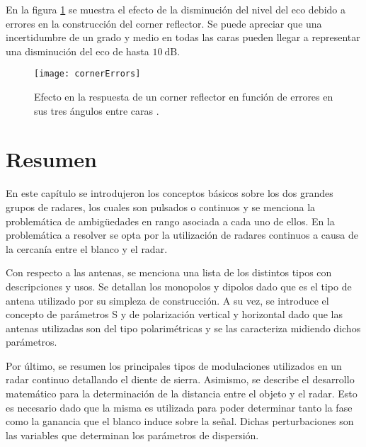 En la figura \ref{fig:cornerErrors} se muestra el efecto de la disminución del nivel del eco debido a errores en la construcción del corner reflector. Se puede apreciar que una incertidumbre de un grado y medio en todas las caras pueden llegar a representar una disminución del eco de hasta $\SI{10}{\dB}$.

\begin{figure}[H]
 \centering
 \texttt{[image: cornerErrors]}
 \caption{Efecto en la respuesta de un corner reflector en función de errores en sus tres ángulos entre caras \cite{Michelson1993}.}
 \label{fig:cornerErrors}
\end{figure}


\section{Resumen}

En este capítulo se introdujeron los conceptos básicos sobre los dos grandes grupos de radares, los cuales son pulsados o continuos y se menciona la problemática de ambigüedades en rango asociada a cada uno de ellos. En la problemática a resolver se opta por la utilización de radares continuos a causa de la cercanía entre el blanco y el radar.

Con respecto a las antenas, se menciona una lista de los distintos tipos con descripciones y usos. Se detallan los monopolos y dipolos dado que es el tipo de antena utilizado por su simpleza de construcción. A su vez, se introduce el concepto de parámetros S y de polarización vertical y horizontal dado que las antenas utilizadas son del tipo polarimétricas y se las caracteriza midiendo dichos parámetros.

Por último, se resumen los principales tipos de modulaciones utilizados en un radar continuo detallando el diente de sierra. Asimismo, se describe el desarrollo matemático para la determinación de la distancia entre el objeto y el radar. Esto es necesario dado que la misma es utilizada para poder determinar tanto la fase como la ganancia que el blanco induce sobre la señal. Dichas perturbaciones son las variables que determinan los parámetros de dispersión.

